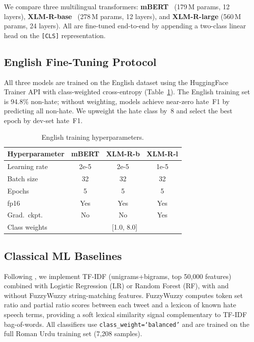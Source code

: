\documentclass{article}
\begin{document}
We compare three multilingual transformers:
\textbf{mBERT}~\citep{devlin2019bert} (179\,M params, 12 layers),
\textbf{XLM-R-base}~\citep{conneau2020unsupervised} (278\,M params, 12 layers), and
\textbf{XLM-R-large} (560\,M params, 24 layers).
All are fine-tuned end-to-end by appending a two-class linear head on the
\texttt{[CLS]} representation.

\subsection{English Fine-Tuning Protocol}

All three models are trained on the English dataset using the HuggingFace Trainer
API with class-weighted cross-entropy (Table~\ref{tab:hparams}).
The English training set is 94.8\% non-hate; without weighting, models achieve
near-zero hate~F1 by predicting all non-hate.
We upweight the hate class by~8 and select the best epoch by dev-set hate~F1.

\begin{table}[h]
\centering
\caption{English training hyperparameters.}
\label{tab:hparams}
\vskip 0.05in
\begin{small}
\begin{tabular}{lccc}
\toprule
Hyperparameter & mBERT & XLM-R-b & XLM-R-l \\
\midrule
Learning rate     & 2e-5  & 2e-5  & 1e-5  \\
Batch size        & 32    & 32    & 32    \\
Epochs            & 5     & 5     & 5     \\
fp16              & Yes   & Yes   & Yes   \\
Grad.\ ckpt.      & No    & No    & Yes   \\
Class weights     & \multicolumn{3}{c}{[1.0, 8.0]} \\
\bottomrule
\end{tabular}
\end{small}
\end{table}

\subsection{Classical ML Baselines}

Following \citet{ullah2024fuzzy}, we implement TF-IDF (unigrams+bigrams,
top 50{,}000 features) combined with Logistic Regression (LR) or Random Forest
(RF), with and without FuzzyWuzzy string-matching features.
FuzzyWuzzy computes token set ratio and partial ratio scores between each tweet
and a lexicon of known hate speech terms, providing a soft lexical similarity
signal complementary to TF-IDF bag-of-words.
All classifiers use \texttt{class\_weight=`balanced'} and are trained on the
full Roman Urdu training set (7{,}208 samples).
\end{document}
